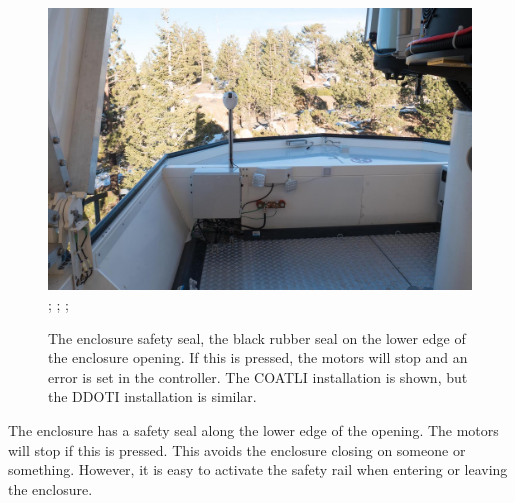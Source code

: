 \begin{figure}
\begin{center}
\begin{labeled}{\includegraphics[width=0.8\linewidth]{figures/enclosure-safety-seal.jpg}}
;
;
;
\end{labeled}
\end{center}
\caption{The enclosure safety seal, the black rubber seal on the lower edge of the enclosure opening. If this is pressed, the motors will stop and an error is set in the controller.
\ifddotioan
The COATLI installation is shown, but the DDOTI installation is similar.
\fi
}
\label{figure:enclosure-safety-seal}
\end{figure}

The enclosure has a safety seal along the lower edge of the opening. The motors will stop if this is pressed. This avoids the enclosure closing on someone or something. However, it is easy to activate the safety rail when entering or leaving the enclosure. 

